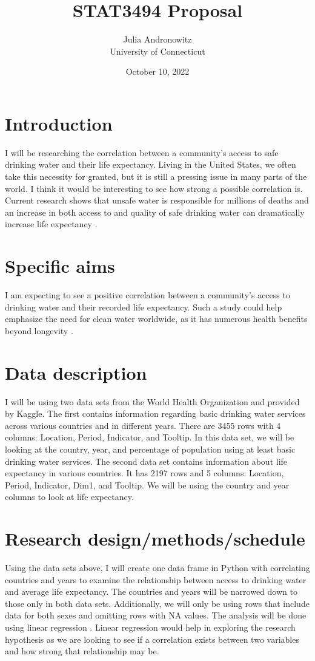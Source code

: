\documentclass[12pt]{article}
\title{STAT3494 Proposal}
\author{Julia Andronowitz\\
University of Connecticut}
\date{October 10, 2022}
\begin{document}
\maketitle

\section{Introduction}
  I will be researching the correlation between a community's access to safe drinking water and their life expectancy. Living in the United States, we often take this necessity for granted, but it is still a pressing issue in many parts of the world. I think it would be interesting to see how strong a possible correlation is. Current research shows that unsafe water is responsible for millions of deaths \citep{ritchieroser2019water} and an increase in both access to and quality of safe drinking water can dramatically increase life expectancy \citep{angelakis2021quality}.
\section{Specific aims}
  I am expecting to see a positive correlation between a community's access to drinking water and their recorded life expectancy. Such a study could help emphasize the need for clean water worldwide, as it has numerous health benefits beyond longevity \citep{popkin2010waterhealth}.
\section{Data description}
  I will be using two data sets from the World Health Organization and provided by Kaggle. The first contains information regarding basic drinking water services across various countries and in different years. There are 3455 rows with 4 columns: Location, Period, Indicator, and Tooltip. In this data set, we will be looking at the country, year, and percentage of population using at least basic drinking water services. The second data set contains information about life expectancy in various countries. It has 2197 rows and 5 columns: Location, Period, Indicator, Dim1, and Tooltip. We will be using the country and year columns to look at life expectancy.
\section{Research design/methods/schedule}
  Using the data sets above, I will create one data frame in Python with correlating countries and years to examine the relationship between access to drinking water and average life expectancy. The countries and years will be narrowed down to those only in both data sets. Additionally, we will only be using rows that include data for both sexes and omitting rows with NA values. The analysis will be done using linear regression \citep{james2021statisticallearning}. Linear regression would help in exploring the research hypothesis as we are looking to see if a correlation exists between two variables and how strong that relationship may be.
\end{document}
